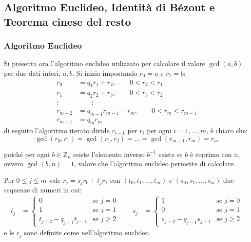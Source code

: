 \subsection{Algoritmo Euclideo, Identità di Bézout e Teorema cinese del resto}
\subsubsection{Algoritmo Euclideo}
Si presenta ora l'algoritmo euclideo utilizzato per calcolare il valore $\gcd(a,b)$ per due dati interi, $a,b$. Si inizia impostando $r_0 = a$ e $r_1 = b$:
\[
    \begin{aligned}
        r_0 &= q_1 r_1 + r_2, \qquad 0 < r_2 < r_1\\
        r_1 &= q_2 r_2 + r_3, \qquad 0 < r_3 < r_2\\
        \vdots &\qquad \vdots \\
        r_{m-2} &= q_{m-1} r_{m-1} + r_m, \qquad 0 < r_m < r_{m-1}\\
        r_{m-1} &= q_m r_m
    \end{aligned}
\]
di seguito l'algoritmo iterato divide $r_{i-1}$ per $r_{i}$ per ogni $i=1,\dots,m$, è chiaro che:
\[
\gcd(r_0,r_1) = \gcd(r_1,r_2) = \ldots = \gcd(r_{m-1},r_m) = r_m
\] 



poiché per ogni $b \in \mathbb{Z}_n$ esiste l'elemento inverso $b^{-1}$ esiste se $b$ è coprimo con $n$, ovvero $\gcd(b,n) = 1$, valore che l'algoritmo euclideo permette di calcolare.

\begin{theorem}
\label{thm:2}
Per $ 0 \leq j \leq m$ vale $r_j = s_j r_0 + t_j r_1$ con $(t_0,t_1,\dots,t_m)$ e $(s_0,s_1,\dots,s_m)$ due sequenze di numeri in cui: 
\[
    \begin{aligned}
    t_j &= \begin{cases}
    0 & \text{se } j = 0\\
    1 & \text{se } j = 1\\
    t_{j-2}-q_{j-1}t_{j-1} & \text{se } j \geq 2 
    \end{cases}
    \qquad
    s_j &= \begin{cases}
    1 & \text{se } j = 0\\
    0 & \text{se } j = 1\\
    s_{j-2}-q_{j-1}s_{j-1} & \text{se } j \geq 2 
    \end{cases}
    \end{aligned}
\]
e le $r_j$ sono definite come nell'algoritmo euclideo.
\end{theorem}

